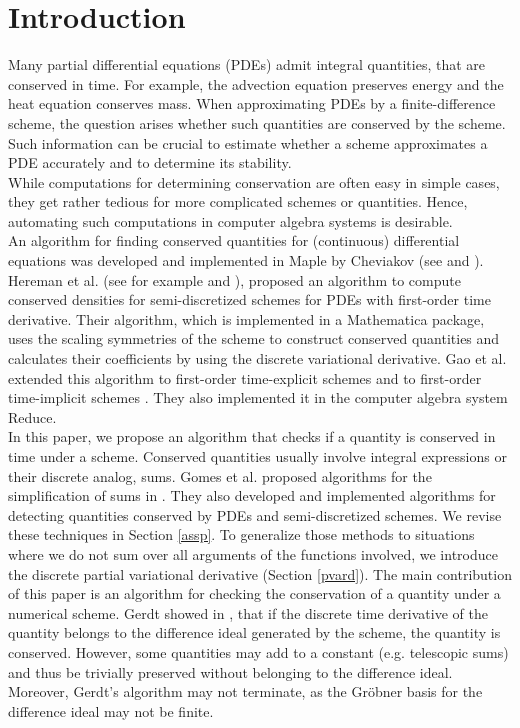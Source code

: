 \documentclass[sigconf,twocolumn]{acmart}
\newcommand{\1}{{\chi}}
\numberwithin{equation}{section}
\theoremstyle{thmlemcorr}
\numberwithin{theorem}{section}
\theoremstyle{thmlemcorr*}
\theoremstyle{defi}
\theoremstyle{remexample}
\theoremstyle{ass}
\begin{document}
\section{Introduction}
Many partial differential equations (PDEs) admit integral quantities, that are conserved in time. 
For example, the advection equation preserves energy and the heat equation conserves mass. 
When approximating PDEs by a finite-difference scheme, the question arises whether such quantities are conserved by the scheme. 
Such information can be crucial to estimate whether a scheme approximates a PDE accurately and to determine its stability.\\
While computations for determining conservation are often easy in simple cases, they get rather tedious for more complicated schemes or quantities. 
Hence, automating such computations 
in computer algebra systems is desirable.\\
An algorithm for finding conserved quantities for (continuous) differential equations was developed and implemented  in {\sc Maple} by Cheviakov (see \cite{cheviakov07} and \cite{cheviakov10}).
Hereman et al. (see for example \cite{hereman04} and \cite{hereman08}), proposed an algorithm to compute conserved densities for semi-discretized schemes for PDEs with first-order time derivative. 
Their algorithm, which is implemented in a {\sc Mathematica} package, uses the scaling symmetries of the scheme to construct conserved quantities and calculates their coefficients by using the discrete variational derivative.
Gao et al. extended this algorithm to first-order time-explicit schemes \cite{gao02} and to first-order time-implicit schemes \cite{gao04}. 
They also implemented it in the computer algebra system {\sc Reduce}.\\
In this paper, we propose an algorithm that checks if a quantity is conserved in time under a scheme.
Conserved quantities usually involve integral expressions or their discrete analog, sums.
Gomes et al. proposed algorithms for the simplification of sums in \cite{gomes20}.
They also developed and implemented algorithms for detecting quantities conserved by PDEs and semi-discretized schemes. 
We revise these techniques in Section \ref{assp}. 
To generalize those methods to situations where we do not sum over all arguments of the functions involved, we introduce the discrete partial variational derivative (Section \ref{pvard}).
The main contribution of this paper is an algorithm for checking the conservation of a quantity under a numerical scheme.
Gerdt showed in \cite{gerdt12}, that if the discrete time derivative of the quantity belongs to the difference ideal generated by the scheme, the quantity is conserved. However, some quantities may add to a constant (e.g. telescopic sums) and thus be trivially preserved without belonging to the difference ideal. Moreover, Gerdt's algorithm may not terminate, as the Gr{\"o}bner basis for the difference ideal may not be finite.
\end{document}
